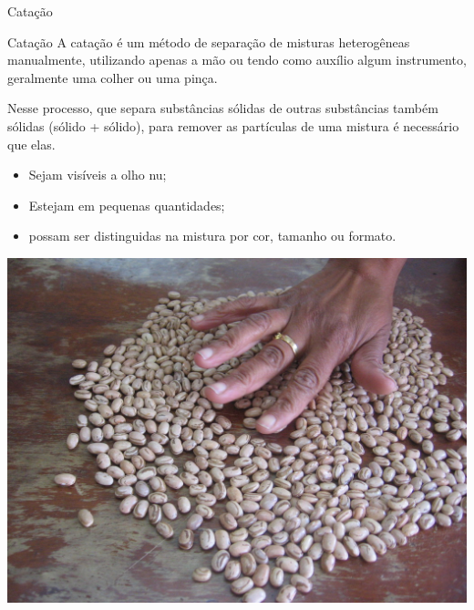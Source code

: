 \documentclass{beamer}
\begin{document}
\begin{frame}[label={sec:orge0d5fd0}]{Catação}
\begin{block}{Catação}
A catação é um método de separação de misturas heterogêneas manualmente, utilizando apenas a mão ou tendo como auxílio algum instrumento, geralmente uma colher ou uma pinça.

Nesse processo, que separa substâncias sólidas de outras substâncias também sólidas (sólido + sólido), para remover as partículas de uma mistura é necessário que elas.

\begin{itemize}
\item Sejam visíveis a olho nu;
\item Estejam em pequenas quantidades;
\item possam ser distinguidas na mistura por cor, tamanho ou formato.
\end{itemize}
\begin{center}
\includegraphics[width=.9\linewidth]{../img/catacao.jpg}
\end{center}
\end{block}
\end{frame}
\end{document}
